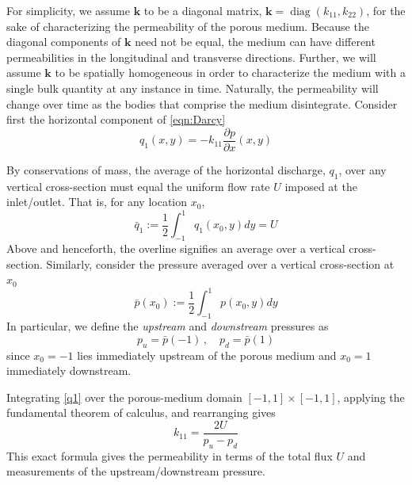 \documentclass[3p]{elsarticle}
\newcommand{\pderiv}[2]{\frac{\partial #1}{\partial #2}}
\newcommand{\bvec}[1]{\mathbf{#1}}
\newcommand{\qavg}{\bar{q}}
\newcommand{\pavg}{\bar{p}}
\newcommand{\pup}{p_u}
\newcommand{\pdn}{p_d}
\newcommand{\diag}{\mathop{\mathrm{diag}}}
\begin{document}


For simplicity, we assume $\bvec{k}$ to be a diagonal matrix, $\bvec{k}  = \diag(k_{11}, k_{22})$, for the sake of characterizing the permeability of the porous medium. Because the diagonal components of $\bvec{k}$ need not be equal, the medium can have different permeabilities in the longitudinal and transverse directions. Further, we will assume $\bvec{k}$ to be spatially homogeneous in order to characterize the medium with a single bulk quantity at any instance in time. Naturally, the permeability will change over time as the bodies that comprise the medium disintegrate. Consider first the horizontal component of \eqref{eqn:Darcy}
\begin{equation}
\label{q1}
q_1(x,y) = -k_{11} \pderiv{p}{x}(x,y)
\end{equation}

By conservations of mass, the average of the horizontal discharge, $q_1$, over any vertical cross-section must equal the uniform flow rate $U$ imposed at the inlet/outlet. That is, for any location $x_0$,
\begin{equation}
\qavg_1 := \frac{1}{2} \int_{-1}^{1} q_1(x_0, y) dy = U
\end{equation}
Above and henceforth, the overline signifies an average over a vertical cross-section. Similarly, consider the pressure averaged over a vertical cross-section at $x_0$
\begin{equation}
\pavg(x_0) := \frac{1}{2} \int_{-1}^{1} p(x_0, y) dy
\end{equation}
In particular, we define the {\em upstream} and {\em downstream} pressures as
\begin{equation}
\pup = \pavg(-1) \, , \quad \pdn = \pavg(1)
\end{equation}
since $x_0 = -1$ lies immediately upstream of the porous medium and $x_0 = 1$ immediately downstream.

Integrating \eqref{q1} over the porous-medium domain $[-1, 1] \times [-1,1]$, applying the fundamental theorem of calculus, and rearranging gives
\begin{equation}
\label{eqn:k11}
k_{11} = \frac{2U}{\pup - \pdn}
\end{equation}
This exact formula gives the permeability in terms of the total flux $U$ and measurements of the upstream/downstream pressure.
\end{document}
